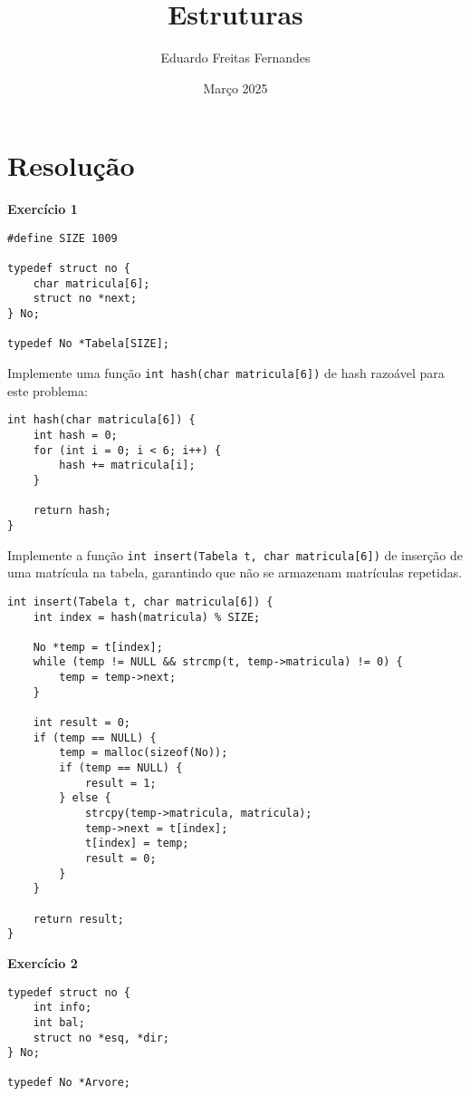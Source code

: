 \documentclass{article}
\title{Estruturas}
\author{Eduardo Freitas Fernandes}
\date{Março 2025}
\begin{document}
\maketitle

\section{Resolução}

\textbf{Exercício 1}

\begin{lstlisting}[style=mystyle]
#define SIZE 1009

typedef struct no {
    char matricula[6];
    struct no *next;
} No;

typedef No *Tabela[SIZE];
\end{lstlisting}

Implemente uma função \texttt{int hash(char matricula[6])} de hash razoável para este problema:
\begin{lstlisting}[style=mystyle]
int hash(char matricula[6]) {
    int hash = 0;
    for (int i = 0; i < 6; i++) {
        hash += matricula[i];
    }

    return hash;
}
\end{lstlisting}

Implemente a função \texttt{int insert(Tabela t, char matricula[6])} de inserção de uma matrícula na tabela, garantindo que não se armazenam matrículas repetidas.
\begin{lstlisting}[style=mystyle]
int insert(Tabela t, char matricula[6]) {
    int index = hash(matricula) % SIZE;

    No *temp = t[index];
    while (temp != NULL && strcmp(t, temp->matricula) != 0) {
        temp = temp->next;
    }

    int result = 0;
    if (temp == NULL) {
        temp = malloc(sizeof(No));
        if (temp == NULL) {
            result = 1;
        } else {
            strcpy(temp->matricula, matricula);
            temp->next = t[index];
            t[index] = temp;
            result = 0;
        }
    }

    return result;
}
\end{lstlisting}

\vspace{0.7cm}
\textbf{Exercício 2}

\begin{lstlisting}[style=mystyle]
typedef struct no {
    int info;
    int bal;
    struct no *esq, *dir;
} No;

typedef No *Arvore;
\end{lstlisting}
\end{document}
